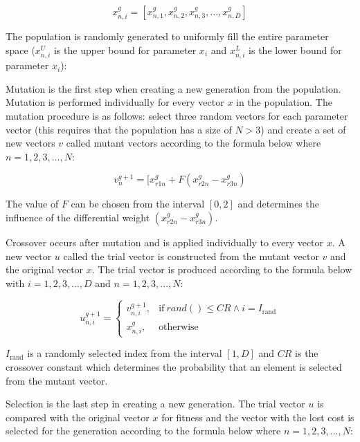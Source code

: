 \begin{equation}
x_{n,i}^{g} = [ x_{n,1}^{g}, x_{n,2}^{g}, x_{n,3}^{g}, ..., x_{n,D}^{g} ]
\end{equation}

The population is randomly generated to uniformly fill the entire parameter space ($x_{n,i}^U$ is the upper bound for parameter $x_i$ and $x_{n,i}^L$ is the lower bound for parameter $x_i$):

Mutation is the first step when creating a new generation from the population. Mutation is performed individually for every vector $x$ in the population. The mutation procedure is as follows: select three random vectors for each parameter vector (this requires that the population has a size of $N > 3$) and create a set of new vectors $v$ called mutant vectors according to the formula below where $n=1,2,3,...,N$:

\begin{equation}
v_{n}^{g+1} = [ x_{r1n}^{g} + F(x_{r2n}^{g} - x_{r3n}^{g})
\end{equation}

The value of $F$ can be chosen from the interval $[0,2]$ and determines the influence of the differential weight $(x_{r2n}^{g} - x_{r3n}^{g})$.

Crossover occurs after mutation and is applied individually to every vector $x$. A new vector $u$ called the trial vector is constructed from the mutant vector $v$ and the original vector $x$. The trial vector is produced according to the formula below with $i=1,2,3,...,D$ and $n=1,2,3,...,N$:

\begin{equation}
    u_{n,i}^{g+1} =
    \begin{cases}
      v_{n,i}^{g+1}, & \text{if}\ rand() \leq CR \wedge i = I_{\text{rand}} \\
      x_{n,i}^{g}, & \text{otherwise}
\end{cases}
\end{equation}

$I_{\text{rand}}$ is a randomly selected index from the interval $[1,D]$ and $CR$ is the crossover constant which determines the probability that an element is selected from the mutant vector.

Selection is the last step in creating a new generation. The trial vector $u$ is compared with the original vector $x$ for fitness and the vector with the lost cost is selected for the generation according to the formula below where $n=1,2,3,...,N$:

